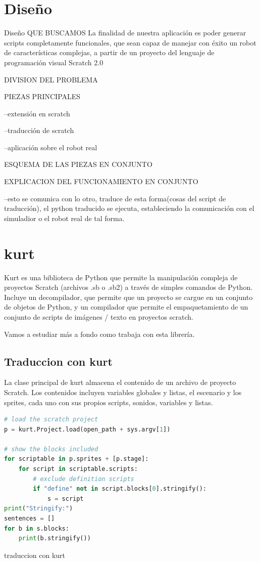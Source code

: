 

\section{Diseño}
\label{sec:diseno}

Diseño
QUE BUSCAMOS
La finalidad de nuestra aplicación es poder generar scripts completamente funcionales, que sean capaz de manejar con éxito un robot de características complejas, a partir de un proyecto del lenguaje de programación visual Scratch 2.0

DIVISION DEL PROBLEMA

PIEZAS PRINCIPALES

--extensión en scratch

--traducción de scratch

--aplicación sobre el robot real

ESQUEMA DE LAS PIEZAS EN CONJUNTO

EXPLICACION DEL FUNCIONAMIENTO EN CONJUNTO

--esto se comunica con lo otro, traduce de esta forma(cosas del script de traducción), el python traducido se ejecuta, estableciendo la comunicación con el simuladior o el robot real de tal forma.
\section{kurt}
\label{sec:kurt}

Kurt es una biblioteca de Python que permite la manipulación compleja de proyectos Scratch (archivos .sb o .sb2) a través de simples comandos de Python. Incluye un decompilador, que permite que un proyecto se cargue en un conjunto de objetos de Python, y un compilador que permite el empaquetamiento de un conjunto de scripts de imágenes / texto en proyectos scratch.

Vamos a estudiar más a fondo como trabaja con esta librería.


\subsection{Traduccion con kurt}
\label{sec:traduccion}
La clase principal de kurt almacena el contenido de un archivo de proyecto Scratch.
Los contenidos incluyen variables globales y listas, el escenario y los sprites, cada uno con sus propios scripts, sonidos, variables y listas.
\begin{lstlisting}[language=python,firstnumber=1]
# load the scratch project
p = kurt.Project.load(open_path + sys.argv[1])

# show the blocks included
for scriptable in p.sprites + [p.stage]:
	for script in scriptable.scripts:
		# exclude definition scripts
		if "define" not in script.blocks[0].stringify():
			s = script
print("Stringify:")
sentences = []
for b in s.blocks:
	print(b.stringify())
\end{lstlisting}
traduccion con kurt

